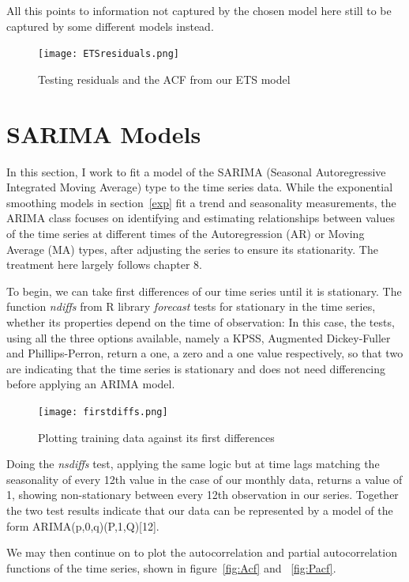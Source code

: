 \documentclass[9pt,technote]{IEEEtran}
\begin{document}
All this points to information not captured by the chosen model here still to be captured by some different models instead. 

\begin{figure}[htbp]
\centerline{\texttt{[image: ETSresiduals.png]}}
\caption{Testing residuals and the ACF from our ETS model}
\label{fig:ETSresiduals}
\end{figure}

\section{SARIMA Models}
\label{sec:arima}

In this section, I work to fit a model of the SARIMA (Seasonal Autoregressive Integrated Moving Average) type to the time series data.  While the exponential smoothing models in section~\ref{exp} fit a trend and seasonality measurements, the ARIMA class focuses on identifying and estimating relationships between values of the time series at different times of the Autoregression (AR) or Moving Average (MA) types, after adjusting the series to ensure its stationarity.  The treatment here largely follows \cite{fpp2} chapter 8.  

To begin, we can take first differences of our time series until it is stationary.  The function \textit{ndiffs} from R library \textit{forecast} tests for stationary in the time series, whether its properties depend on the time of observation:  In this case, the tests, using all the three options available, namely a KPSS, Augmented Dickey-Fuller and  Phillips-Perron, return a one, a zero and a one value respectively, so that two are indicating that the time series is stationary and does not need differencing before applying an ARIMA model.  

\begin{figure}[htbp]
\centerline{\texttt{[image: firstdiffs.png]}}
\caption{Plotting training data against its first differences}
\label{fig:firstdiffs}
\end{figure}

Doing the \textit{nsdiffs} test, applying the same logic but at time lags matching the seasonality of every 12th value in the case of our monthly data, returns a value of 1, showing non-stationary between every 12th observation in our series.  Together the two test results indicate that our data can be represented by a model of the form ARIMA(p,0,q)(P,1,Q)[12]. 

We may then continue on to plot the autocorrelation and partial autocorrelation functions of the time series, shown in figure~\ref{fig:Acf} and ~\ref{fig:Pacf}.  
\end{document}
